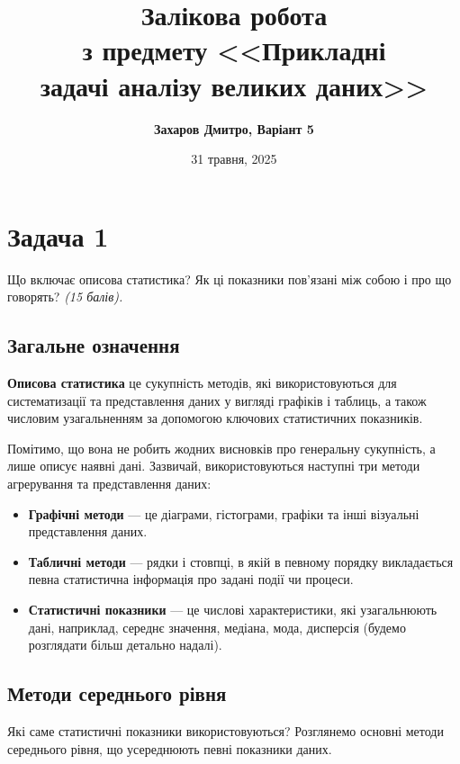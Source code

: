 \documentclass{exam_template}
\title{\bfseries Залікова робота \\з предмету <<Прикладні \\ задачі аналізу великих даних>>}
\author{\bfseries Захаров Дмитро, Варіант 5}
\date{31 травня, 2025}
\begin{document}
\pagestyle{fancy}

\maketitle

\tableofcontents

\newpage

\section{Задача 1}

\begin{problem}
    Що включає описова статистика? Як ці показники пов’язані між собою і про що
говорять? \textit{(15 балів).}
\end{problem}

\subsection{Загальне означення}\label{sec:descriptive_statistics}

\begin{definition}
\textbf{Описова статистика} це сукупність методів, які
використовуються для систематизації та представлення даних у вигляді графіків і
таблиць, а також числовим узагальненням за допомогою ключових статистичних
показників.
\end{definition}

Помітимо, що вона не робить жодних висновків про генеральну сукупність, а лише
описує наявні дані. Зазвичай, використовуються наступні три методи 
агрерування та представлення даних:
\begin{itemize}
    \item \textbf{Графічні методи} — це діаграми, гістограми, графіки та інші
    візуальні представлення даних.
    \item \textbf{Табличні методи} — рядки і стовпці, в якій в певному порядку
    викладається певна статистична інформація про задані події чи процеси.
    \item \textbf{Статистичні показники} — це числові характеристики, які
    узагальнюють дані, наприклад, середнє значення, медіана, мода, дисперсія
    (будемо розглядати більш детально надалі).
\end{itemize}

\subsection{Методи середнього рівня}\label{sec:central_tendency}
Які саме статистичні показники використовуються? Розглянемо основні 
методи середнього рівня, що усереднюють певні показники даних.
\end{document}
